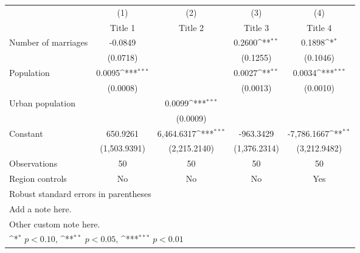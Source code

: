 {
\def\sym#1{\ifmmode^{#1}\else\(^{#1}\)\fi}
\begin{tabular}{l*{4}{c}}
\hline\hline
                    &\multicolumn{1}{c}{(1)}&\multicolumn{1}{c}{(2)}&\multicolumn{1}{c}{(3)}&\multicolumn{1}{c}{(4)}\\
                    &\multicolumn{1}{c}{Title 1}&\multicolumn{1}{c}{Title 2}&\multicolumn{1}{c}{Title 3}&\multicolumn{1}{c}{Title 4}\\
\hline
Number of marriages &     -0.0849         &                     &      0.2600\sym{**} &      0.1898\sym{*}  \\
                    &    (0.0718)         &                     &    (0.1255)         &    (0.1046)         \\
[1em]
Population          &      0.0095\sym{***}&                     &      0.0027\sym{**} &      0.0034\sym{***}\\
                    &    (0.0008)         &                     &    (0.0013)         &    (0.0010)         \\
[1em]
Urban population    &                     &      0.0099\sym{***}&                     &                     \\
                    &                     &    (0.0009)         &                     &                     \\
[1em]
Constant            &    650.9261         &  6,464.6317\sym{***}&   -963.3429         & -7,786.1667\sym{**} \\
                    &(1,503.9391)         &(2,215.2140)         &(1,376.2314)         &(3,212.9482)         \\
\hline
Observations        &          50         &          50         &          50         &          50         \\
Region controls     &          No         &          No         &          No         &         Yes         \\
\hline\hline
\multicolumn{5}{l}{\footnotesize Robust standard errors in parentheses}\\
\multicolumn{5}{l}{\footnotesize Add a note here.}\\
\multicolumn{5}{l}{\footnotesize Other custom note here.}\\
\multicolumn{5}{l}{\footnotesize \sym{*} \(p<0.10\), \sym{**} \(p<0.05\), \sym{***} \(p<0.01\)}\\
\end{tabular}
}
